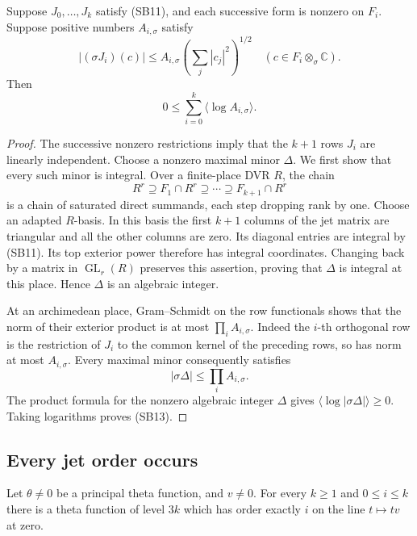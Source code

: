 \begin{srlemma}\label{lem:sr-slope-integral-flag-det}
Suppose \(J_0,\ldots,J_k\) satisfy (SB11),
and each successive form is nonzero on
\(F_i\).
Suppose positive numbers \(A_{i,\sigma}\)
satisfy
\[
 |(\sigma J_i)(c)|
      \le A_{i,\sigma}\left(\sum_j|c_j|^2\right)^{1/2}
 \quad(c\in F_i\otimes_\sigma\mathbb C).
\]
Then
\[
                   0\le\sum_{i=0}^k
                                   \langle\log A_{i,\sigma}\rangle. \tag{SB13}
\]
\end{srlemma}

\begin{proof}
The successive nonzero restrictions imply
that the \(k+1\) rows \(J_i\) are linearly
independent.
Choose a nonzero maximal minor \(\Delta\).
We first show that every such minor is
integral.
Over a finite-place DVR \(R\), the chain
\[
 R^r\supseteq F_1\cap R^r\supseteq\cdots
                      \supseteq F_{k+1}\cap R^r
\]
is a chain of saturated direct summands,
each step dropping rank by one.
Choose an adapted \(R\)-basis.
In this basis the first \(k+1\) columns
of the jet matrix are triangular and all
the other columns are zero.
Its diagonal entries are integral by
(SB11).
Its top exterior power therefore has
integral coordinates.
Changing back by a matrix in
\(\operatorname{GL}_r(R)\) preserves this
assertion, proving that \(\Delta\) is
integral at this place.
Hence \(\Delta\) is an algebraic integer.

At an archimedean place, Gram--Schmidt on
the row functionals shows that the norm of
their exterior product is at most
\(\prod_iA_{i,\sigma}\).
Indeed the \(i\)-th orthogonal row is the
restriction of \(J_i\) to the common
kernel of the preceding rows, so has norm
at most \(A_{i,\sigma}\).
Every maximal minor consequently satisfies
\[
                     |\sigma\Delta|
                            \le\prod_i A_{i,\sigma}.
\]
The product formula for the nonzero
algebraic integer \(\Delta\) gives
\(\langle\log|\sigma\Delta|\rangle\ge0\).
Taking logarithms proves (SB13).
\end{proof}

\subsection{Every jet order occurs}

\begin{srlemma}\label{lem:sr-slope-directional-jet-jumps}
Let \(\theta\ne0\) be a principal theta
function, and \(v\ne0\).
For every \(k\ge1\) and \(0\le i\le k\)
there is a theta function of level \(3k\)
which has order exactly \(i\) on the line
\(t\mapsto tv\) at zero.
\end{srlemma}

